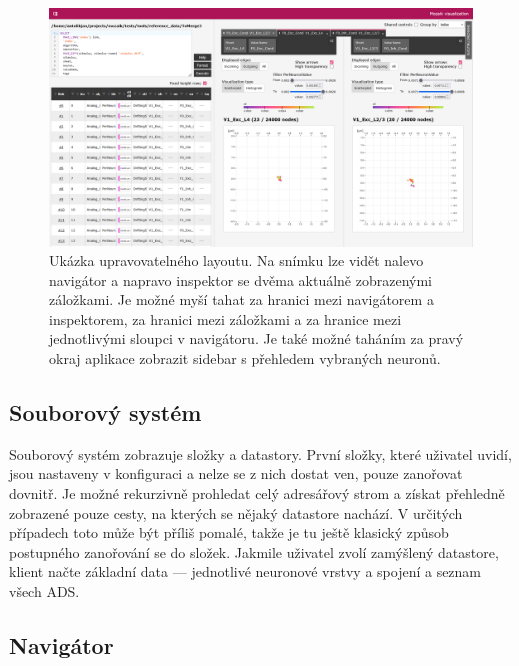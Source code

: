 \begin{figure}
  \centering
  \includegraphics[width=1\linewidth]{img/screenshot_multiview.png}
  \caption{Ukázka upravovatelného layoutu. Na snímku lze vidět nalevo navigátor a napravo inspektor se dvěma aktuálně zobrazenými záložkami. Je možné myší tahat za hranici mezi navigátorem a inspektorem, za hranici mezi záložkami a za hranice mezi jednotlivými sloupci v navigátoru. Je také možné taháním za pravý okraj aplikace zobrazit sidebar s přehledem vybraných neuronů.}
  \label{fig:multiview}
\end{figure}

\subsection{Souborový systém}

Souborový systém zobrazuje složky a datastory. První složky, které uživatel uvidí, jsou nastaveny v konfiguraci a nelze se z nich dostat ven, pouze zanořovat dovnitř. Je možné rekurzivně prohledat celý adresářový strom a získat přehledně zobrazené pouze cesty, na kterých se nějaký datastore nachází. V určitých případech toto může být příliš pomalé, takže je tu ještě klasický způsob postupného zanořování se do složek. Jakmile uživatel zvolí zamýšlený datastore, klient načte základní data --- jednotlivé neuronové vrstvy a spojení a seznam všech ADS.

\subsection{Navigátor}

